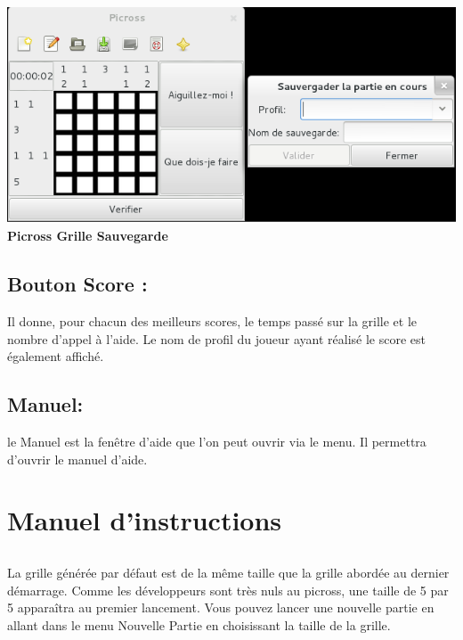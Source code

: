               \begin{center}
                      \includegraphics[scale=0.6]{data/screenMaquette/SauvegardeGrille.png}\\
                      \textbf{ Picross Grille Sauvegarde}
              \end{center}


        \subsection{Bouton Score :}
               Il donne, pour chacun des meilleurs scores, le temps passé sur la grille et le nombre d'appel à l'aide. Le nom de profil du joueur ayant réalisé le score est également affiché.
            
            
        \subsection{Manuel:}
              le Manuel est la fenêtre d’aide que l’on peut ouvrir via le menu. Il permettra d'ouvrir le manuel d'aide.\\ 
              
              
              
\section{Manuel d’instructions}
    \subsection{}
    \paragraph{}
    
      La grille générée par défaut est de la même taille que la grille abordée au dernier démarrage. Comme les développeurs sont très nuls au picross, une taille de 5 par 5 apparaîtra au premier lancement. Vous pouvez lancer une nouvelle partie en allant dans le menu Nouvelle Partie en choisissant la taille de la grille.\\      

